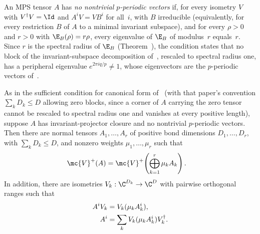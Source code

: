 \begin{definition}
    \label{def:no_periodic_vectors}
    \leanok
    An MPS tensor $A$ has \emph{no nontrivial $p$-periodic vectors} if, for
    every isometry $V$ with $V^\dagger V=\Id$ and $A^iV=VB^i$ for all~$i$,
    with $B$ irreducible (equivalently, for every restriction $B$ of $A$ to a
    minimal invariant subspace), and for every $\rho>0$ and $r>0$ with
    $\E_B(\rho)=r\rho$, every eigenvalue of $\E_B$ of modulus~$r$ equals~$r$.
    Since $r$ is the spectral radius of $\E_B$
    (Theorem~\cite[``Spectral radius is the Perron eigenvalue'']{QICLean2026Blueprint}), the condition states
    that no block of the invariant-subspace decomposition
    of~\cite[Section~2]{Cirac2016MPDO_arXiv}, rescaled to spectral radius
    one, has a peripheral eigenvalue $e^{2\pi iq/p}\neq1$, whose eigenvectors
    are the $p$-periodic vectors of~\cite[Section~2]{Cirac2016MPDO_arXiv}.
\end{definition}


\begin{lemma}
    \label{thm:projector_closure_canonical_form}
    \leanok
    As in the sufficient condition for canonical form
    of~\cite[Section~2]{Cirac2016MPDO_arXiv} (with that paper's convention
    $\sum_kD_k\le D$ allowing zero blocks, since a corner of $A$ carrying the
    zero tensor cannot be rescaled to spectral radius one and vanishes at
    every positive length), suppose $A$ has invariant-projector closure and no
    nontrivial $p$-periodic vectors. Then there are normal tensors
    $A_1,\ldots,A_r$ of positive bond dimensions $D_1,\ldots,D_r$, with
    $\sum_kD_k\le D$, and nonzero weights $\mu_1,\ldots,\mu_r$ such that
    \begin{align}
        \mc{V}^+(A)
         & =
        \mc{V}^+\!\left(\bigoplus_{k=1}^r\mu_kA_k\right).
        \label{eq:canonical_projector_decomp}
    \end{align}
    In addition, there are isometries $V_k:\C^{D_k}\to\C^D$ with pairwise
    orthogonal ranges such that
    \begin{align}
        A^iV_k
         & =V_k(\mu_kA_k^i),
        \notag                                \\
        A^i
         & =\sum_kV_k(\mu_kA_k^i)V_k^\dagger.
        \label{eq:canonical_projector_isometries}
    \end{align}
\end{lemma}

